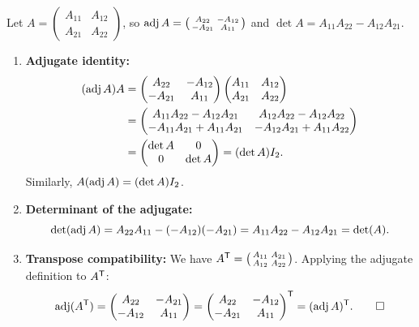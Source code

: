 \begin{exercisesolution}
\label{sol:properties_2x2_adjugate}
Let $A = \left(\begin{smallmatrix} A_{11} & A_{12} \\ A_{21} & A_{22} \end{smallmatrix}\right)$, so $\operatorname{adj} A = \left(\begin{smallmatrix} A_{22} & -A_{12} \\ -A_{21} & A_{11} \end{smallmatrix}\right)$ and $\det A = A_{11} A_{22} - A_{12} A_{21}$.

\begin{enumerate}[label=\textbf{(\alph*)}]
    \item \textbf{Adjugate identity:}
    \begin{align*}
    (\operatorname{adj} A) A &= \begin{pmatrix} A_{22} & -A_{12} \\ -A_{21} & A_{11} \end{pmatrix} \begin{pmatrix} A_{11} & A_{12} \\ A_{21} & A_{22} \end{pmatrix} \\
    &= \begin{pmatrix} A_{11}A_{22} - A_{12}A_{21} & A_{12}A_{22} - A_{12}A_{22} \\ -A_{11}A_{21} + A_{11}A_{21} & -A_{12}A_{21} + A_{11}A_{22} \end{pmatrix} \\
    &= \begin{pmatrix} \det A & 0 \\ 0 & \det A \end{pmatrix} = (\det A) I_2.
    \end{align*}
    Similarly, $A (\operatorname{adj} A) = (\det A) I_2$.

    \item \textbf{Determinant of the adjugate:}
    \[
    \det(\operatorname{adj} A) = A_{22} A_{11} - (-A_{12})(-A_{21}) = A_{11} A_{22} - A_{12} A_{21} = \det(A).
    \]

    \item \textbf{Transpose compatibility:}
    We have $A^{\mathsf{T}} = \left(\begin{smallmatrix} A_{11} & A_{21} \\ A_{12} & A_{22} \end{smallmatrix}\right)$.
    Applying the adjugate definition to $A^{\mathsf{T}}$:
    \[
    \operatorname{adj}(A^{\mathsf{T}}) = \begin{pmatrix} A_{22} & -A_{21} \\ -A_{12} & A_{11} \end{pmatrix} = \begin{pmatrix} A_{22} & -A_{12} \\ -A_{21} & A_{11} \end{pmatrix}^{\mathsf{T}} = (\operatorname{adj} A)^{\mathsf{T}}. \qedhere
    \]
\end{enumerate}
\end{exercisesolution}
